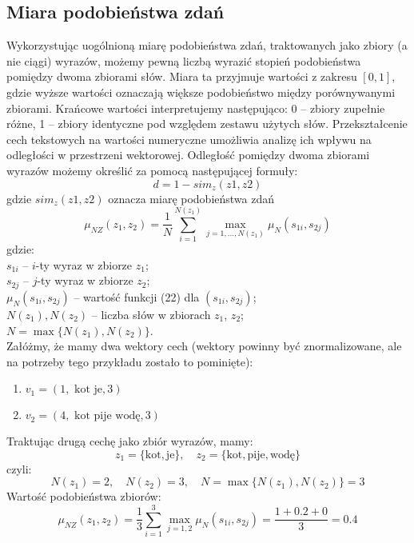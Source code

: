 \documentclass{article}
\begin{document}
\subsection{Miara podobieństwa zdań}
Wykorzystując uogólnioną miarę podobieństwa zdań, traktowanych jako zbiory (a nie ciągi) wyrazów, możemy pewną liczbą wyrazić stopień podobieństwa pomiędzy dwoma zbiorami słów. Miara ta przyjmuje wartości z zakresu \([0,1]\), gdzie wyższe wartości oznaczają większe podobieństwo między porównywanymi zbiorami. Krańcowe wartości interpretujemy następująco: 0 – zbiory zupełnie różne, 1 – zbiory identyczne pod względem zestawu użytych słów. Przekształcenie cech tekstowych na wartości numeryczne umożliwia analizę ich wpływu na odległości w przestrzeni wektorowej. Odległość pomiędzy dwoma zbiorami wyrazów możemy określić za pomocą następującej formuły:
\begin{equation}
    d = 1 - sim_z(z1, z2)
\end{equation}
gdzie \(sim_z(z1,z2)\) oznacza miarę podobieństwa zdań\\
\begin{equation} 
\mu_{NZ}(z_1, z_2) = \frac{1}{N} \sum_{i=1}^{N(z_1)} \max_{j = 1, \ldots, N(z_1)} \mu_N(s_{1i}, s_{2j})
\end{equation}
gdzie:\\
 $s_{1i}$ – $i$-ty wyraz w zbiorze $z_1$;\\
 $s_{2j}$ – $j$-ty wyraz w zbiorze $z_2$;\\
 $\mu_N(s_{1i}, s_{2j})$ – wartość funkcji (22) dla $(s_{1i}, s_{2j})$;\\
 $N(z_1), N(z_2)$ – liczba słów w zbiorach $z_1$, $z_2$;\\
 $N = \max\{N(z_1), N(z_2)\}$.\\
Załóżmy, że mamy dwa wektory cech (wektory powinny być znormalizowane, ale na potrzeby tego przykładu zostało to pominięte):
\begin{enumerate}
    \item \(v_1 = (1, \text{ kot je}, 3)\)
    \item \(v_2 = (4, \text{ kot pije wodę}, 3)\)
\end{enumerate}
Traktując drugą cechę jako zbiór wyrazów, mamy:
\[
z_1 = \{\text{kot}, \text{je}\}, \quad z_2 = \{\text{kot}, \text{pije}, \text{wodę}\}
\]
czyli:
\[
N(z_1) = 2, \quad N(z_2) = 3, \quad N = \max\{N(z_1), N(z_2)\} = 3
\]
Wartość podobieństwa zbiorów:
\[
\mu_{NZ}(z_1, z_2) = \frac{1}{3}\sum_{i=1}^{3} \max_{j = 1, 2} \mu_N(s_{1i}, s_{2j}) = \frac{1 + 0.2 + 0}{3} = 0.4
\]
\end{document}
